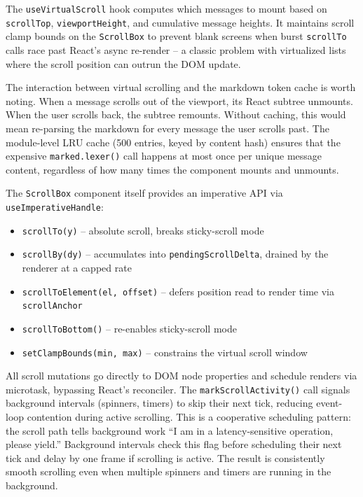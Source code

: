 \documentclass[
  english,
  11pt,
  letterpaper,
]{book}
\providecommand{\tightlist}{%
  \setlength{\itemsep}{0pt}\setlength{\parskip}{0pt}}
\begin{document}
The \texttt{useVirtualScroll} hook computes which messages to mount
based on \texttt{scrollTop}, \texttt{viewportHeight}, and cumulative
message heights. It maintains scroll clamp bounds on the
\texttt{ScrollBox} to prevent blank screens when burst \texttt{scrollTo}
calls race past React's async re-render -- a classic problem with
virtualized lists where the scroll position can outrun the DOM update.

The interaction between virtual scrolling and the markdown token cache
is worth noting. When a message scrolls out of the viewport, its React
subtree unmounts. When the user scrolls back, the subtree remounts.
Without caching, this would mean re-parsing the markdown for every
message the user scrolls past. The module-level LRU cache (500 entries,
keyed by content hash) ensures that the expensive
\texttt{marked.lexer()} call happens at most once per unique message
content, regardless of how many times the component mounts and unmounts.

The \texttt{ScrollBox} component itself provides an imperative API via
\texttt{useImperativeHandle}:

\begin{itemize}
\tightlist
\item
  \texttt{scrollTo(y)} -- absolute scroll, breaks sticky-scroll mode
\item
  \texttt{scrollBy(dy)} -- accumulates into \texttt{pendingScrollDelta},
  drained by the renderer at a capped rate
\item
  \texttt{scrollToElement(el,\ offset)} -- defers position read to
  render time via \texttt{scrollAnchor}
\item
  \texttt{scrollToBottom()} -- re-enables sticky-scroll mode
\item
  \texttt{setClampBounds(min,\ max)} -- constrains the virtual scroll
  window
\end{itemize}

All scroll mutations go directly to DOM node properties and schedule
renders via microtask, bypassing React's reconciler. The
\texttt{markScrollActivity()} call signals background intervals
(spinners, timers) to skip their next tick, reducing event-loop
contention during active scrolling. This is a cooperative scheduling
pattern: the scroll path tells background work ``I am in a
latency-sensitive operation, please yield.'' Background intervals check
this flag before scheduling their next tick and delay by one frame if
scrolling is active. The result is consistently smooth scrolling even
when multiple spinners and timers are running in the background.
\end{document}
